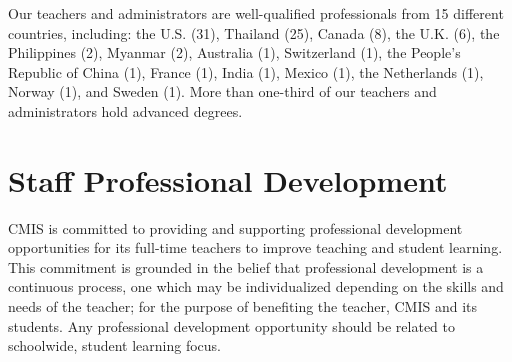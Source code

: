 

Our teachers and administrators are well-qualified professionals from 15 different countries, including:  the U.S. (31), Thailand (25), Canada (8), the U.K. (6), the Philippines (2), Myanmar (2), Australia (1), Switzerland (1), the People’s Republic of China (1), France (1), India (1), Mexico (1), the Netherlands (1), Norway (1), and Sweden (1).  More than one-third of our teachers and administrators hold advanced degrees.


\section{Staff Professional Development}

CMIS is committed to providing and supporting professional development opportunities for its full-time teachers to improve teaching and student learning. This commitment is grounded in the belief that professional development is a continuous process, one which may be individualized depending on the skills and needs of the teacher; for the purpose of benefiting the teacher, CMIS and its students.  Any professional development opportunity should be related to schoolwide, student learning focus. 

